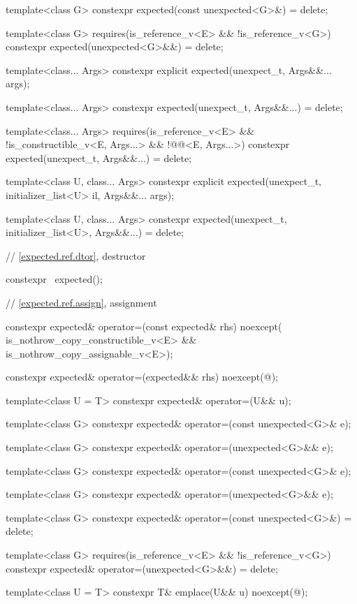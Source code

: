 \begin{codeblock}
{{    template<class G> constexpr expected(const unexpected<G>&) = delete;

    template<class G>
      requires(is_reference_v<E> && !is_reference_v<G>)
    constexpr expected(unexpected<G>&&) = delete;

    template<class... Args> constexpr explicit expected(unexpect_t, Args&&... args);

    template<class... Args> constexpr expected(unexpect_t, Args&&...) = delete;

    template<class... Args>
      requires(is_reference_v<E> && !is_constructible_v<E, Args...> &&
               !@@<E, Args...>)
    constexpr expected(unexpect_t, Args&&...) = delete;

    template<class U, class... Args>
    constexpr explicit expected(unexpect_t, initializer_list<U> il, Args&&... args);

    template<class U, class... Args>
    constexpr expected(unexpect_t, initializer_list<U>, Args&&...) = delete;

    // \ref{expected.ref.dtor}, destructor

    constexpr ~expected();

    // \ref{expected.ref.assign}, assignment

    constexpr expected& operator=(const expected& rhs) noexcept(
        is_nothrow_copy_constructible_v<E> && is_nothrow_copy_assignable_v<E>);

    constexpr expected& operator=(expected&& rhs) noexcept(@\seebelow@);

    template<class U = T> constexpr expected& operator=(U&& u);

    template<class G> constexpr expected& operator=(const unexpected<G>& e);

    template<class G> constexpr expected& operator=(unexpected<G>&& e);

    template<class G> constexpr expected& operator=(const unexpected<G>& e);

    template<class G> constexpr expected& operator=(unexpected<G>&& e);

    template<class G> constexpr expected& operator=(const unexpected<G>&) = delete;

    template<class G>
      requires(is_reference_v<E> && !is_reference_v<G>)
    constexpr expected& operator=(unexpected<G>&&) = delete;

    template<class U = T> constexpr T& emplace(U&& u) noexcept(@\seebelow@);

}}
\end{codeblock}
